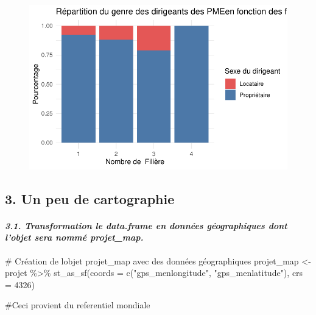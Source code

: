 \documentclass[
  letterpaper,
  DIV=11,
  numbers=noendperiod]{scrartcl}
\let\oldparagraph\paragraph
\renewcommand{\paragraph}[1]{\oldparagraph{#1}\mbox{}}
\newenvironment{Shaded}{\begin{snugshade}}{\end{snugshade}}
\newcommand{\AttributeTok}[1]{\textcolor[rgb]{0.40,0.45,0.13}{#1}}
\newcommand{\CommentTok}[1]{\textcolor[rgb]{0.37,0.37,0.37}{#1}}
\newcommand{\DecValTok}[1]{\textcolor[rgb]{0.68,0.00,0.00}{#1}}
\newcommand{\FunctionTok}[1]{\textcolor[rgb]{0.28,0.35,0.67}{#1}}
\newcommand{\NormalTok}[1]{\textcolor[rgb]{0.00,0.23,0.31}{#1}}
\newcommand{\OtherTok}[1]{\textcolor[rgb]{0.00,0.23,0.31}{#1}}
\newcommand{\SpecialCharTok}[1]{\textcolor[rgb]{0.37,0.37,0.37}{#1}}
\newcommand{\StringTok}[1]{\textcolor[rgb]{0.13,0.47,0.30}{#1}}
\begin{document}
\begin{figure}[H]

{\centering \includegraphics{projet_R_files/figure-pdf/unnamed-chunk-35-1.pdf}

}

\end{figure}

\hypertarget{un-peu-de-cartographie}{%
\subsection{3. Un peu de cartographie}\label{un-peu-de-cartographie}}

\hypertarget{transformation-le-data.frame-en-donnuxe9es-guxe9ographiques-dont-lobjet-sera-nommuxe9-projet_map.}{%
\paragraph{\texorpdfstring{\emph{3.1. Transformation le data.frame en
données géographiques dont l'objet sera nommé
projet\_map.}}{3.1. Transformation le data.frame en données géographiques dont l'objet sera nommé projet\_map.}}\label{transformation-le-data.frame-en-donnuxe9es-guxe9ographiques-dont-lobjet-sera-nommuxe9-projet_map.}}

\begin{Shaded}
\begin{Highlighting}[]
\CommentTok{\# Création de l\textquotesingle{}objet projet\_map avec des données géographiques}
\NormalTok{projet\_map }\OtherTok{\textless{}{-}}\NormalTok{ projet }\SpecialCharTok{\%\textgreater{}\%}
  \FunctionTok{st\_as\_sf}\NormalTok{(}\AttributeTok{coords =} \FunctionTok{c}\NormalTok{(}\StringTok{"gps\_menlongitude"}\NormalTok{, }\StringTok{"gps\_menlatitude"}\NormalTok{), }\AttributeTok{crs =} \DecValTok{4326}\NormalTok{)}

\CommentTok{\#Ceci provient du referentiel mondiale}
\end{Highlighting}
\end{Shaded}
\end{document}
